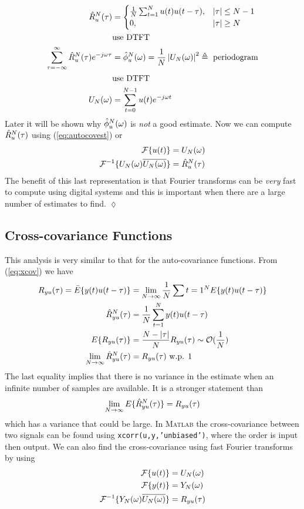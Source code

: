 \begin{example}
\begin{align*}
\hat{R}_u^N(\tau) &= \begin{cases} \frac{1}{N}\sum_{t=1}^Nu(t)u(t-\tau), & |\tau|\leq N-1 \\ 0, & |\tau|\geq N \end{cases} \\
&\text{use DTFT} \\
\sum_{\tau=-\infty}^\infty\hat{R}_u^N(\tau) e^{-j\omega\tau} &= \hat{\phi}_u^N(\omega) = \frac{1}{N}\left|U_N(\omega)\right|^2 \triangleq \text{ periodogram} \\
&\text{use DTFT} \\
U_N(\omega) &= \sum_{t=0}^{N-1}u(t)e^{-j\omega t}
\end{align*}
Later it will be shown why $\hat{\phi}_u^N(\omega)$ is \textit{not} a good estimate. Now we can compute $\hat{R}_u^N(\tau)$ using (\ref{eq:autocovest}) or
\begin{align*}
\mathcal{F}\{u(t)\} &= U_N(\omega) \\
\mathcal{F}^{-1}\{U_N(\omega)\overline{U_N(\omega)}\} &= \hat{R}_u^N(\tau)
\end{align*}
The benefit of this last representation is that Fourier transforms can be \textit{very} fast to compute using digital systems and this is important when there are a large number of estimates to find.
$\lozenge$
\end{example}

\subsection{Cross-covariance Functions}
This analysis is very similar to that for the auto-covariance functions. From (\ref{eq:xcov}) we have
\begin{align*}
R_{yu}(\tau) = \bar{E}\{y(t)u(t-\tau)\} &= \lim_{N\to\infty}\frac{1}{N}\sum{t=1}^N E\{y(t)u(t-\tau)\} \\
\hat{R}_{yu}^N(\tau) &= \frac{1}{N}\sum_{t=1}^Ny(t)u(t-\tau) \\
E\{R_{yu}(\tau)\} &= \frac{N-|\tau|}{N}R_{yu}(\tau) \sim \mathcal{O}(\frac{1}{N}) \\
\lim_{N\to\infty}\hat{R}_{yu}^N(\tau) &= R_{yu}(\tau) \text{ w.p. } 1
\end{align*}
The last equality implies that there is no variance in the estimate when an infinite number of samples are available. It is a stronger statement than
$$\lim_{N\to\infty}E\{\hat{R}_{yu}^N(\tau)\} = R_{yu}(\tau)$$
which has a variance that could be large. In \textsc{Matlab} the cross-covariance between two signals can be found using \texttt{xcorr(u,y,'unbiased')}, where the order is input then output. We can also find the cross-covariance using fast Fourier transforms by using
\begin{align*}
\mathcal{F}\{u(t)\} &= U_N(\omega) \\
\mathcal{F}\{y(t)\} &= Y_N(\omega) \\
\mathcal{F}^{-1}\{Y_N(\omega)\overline{U_N(\omega)}\} &= R_{yu}(\tau)
\end{align*}

